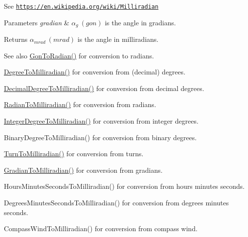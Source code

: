 See \href{https://en.wikipedia.org/wiki/Milliradian}{\tt https\+://en.\+wikipedia.\+org/wiki/\+Milliradian} 
\begin{DoxyParams}{Parameters}
{\em gradian} & $\alpha_{g}\ (gon)$ is the angle in gradians. \\
\hline
\end{DoxyParams}
\begin{DoxyReturn}{Returns}
$\alpha_{mrad}\ (mrad)$ is the angle in milliradians. 
\end{DoxyReturn}
\begin{DoxySeeAlso}{See also}
\mbox{\hyperlink{group___e_g_x_math-_angle_conversions-_gon_gafdf7d525a98427da55b86ff420a5ec86}{Gon\+To\+Radian()}} for conversion to radians. 

\mbox{\hyperlink{group___e_g_x_math-_angle_conversions-_degree_gae4fa6c2d3805430760783650cfbfdb11}{Degree\+To\+Milliradian()}} for conversion from (decimal) degrees. 

\mbox{\hyperlink{group___e_g_x_math-_angle_conversions-_decimal_degree_gab567d02d4692d9642a4ad219e479713a}{Decimal\+Degree\+To\+Milliradian()}} for conversion from decimal degrees. 

\mbox{\hyperlink{group___e_g_x_math-_angle_conversions-_radian_gaea391f0cca39b05e298dd1cae162e7f1}{Radian\+To\+Milliradian()}} for conversion from radians. 

\mbox{\hyperlink{group___e_g_x_math-_angle_conversions-_integer_degree_ga5379a68bdff5cc4fab5bb1ba06ef9453}{Integer\+Degree\+To\+Milliradian()}} for conversion from integer degrees. 

Binary\+Degree\+To\+Milliradian() for conversion from binary degrees. 

\mbox{\hyperlink{group___e_g_x_math-_angle_conversions-_turn_ga2aea2621472294ce4c25ac7e55db51c6}{Turn\+To\+Milliradian()}} for conversion from turns. 

\mbox{\hyperlink{group___e_g_x_math-_angle_conversions-_gradian_ga144f1019dc760268a163d81fcb3ce482}{Gradian\+To\+Milliradian()}} for conversion from gradians. 

Hours\+Minutes\+Seconds\+To\+Milliradian() for conversion from hours minutes seconds. 

Degrees\+Minutes\+Seconds\+To\+Milliradian() for conversion from degrees minutes seconds. 

Compass\+Wind\+To\+Milliradian() for conversion from compass wind. 
\end{DoxySeeAlso}
\mbox{\label{group___e_g_x_math-_angle_conversions-_gon_gafdf7d525a98427da55b86ff420a5ec86}} 
